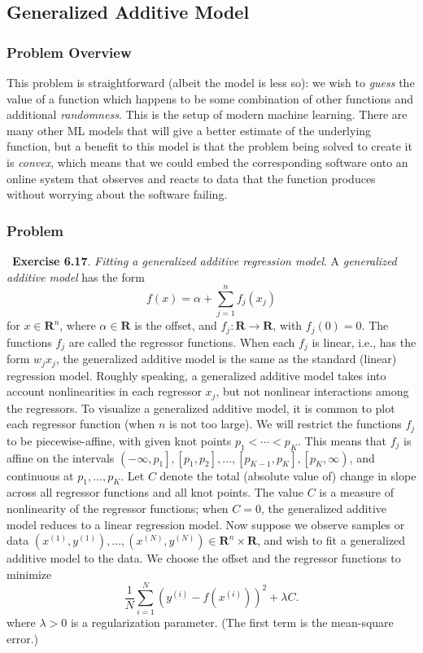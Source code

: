 \documentclass[12pt,reqno]{article}
\theoremstyle{definition}
\numberwithin{equation}{section}
\begin{document}
\newpage
\subsection{Generalized Additive Model}

\subsubsection*{Problem Overview}
This problem is straightforward (albeit the model is less so): we wish to \textit{guess} the value
of a function which happens to be some combination of other functions and additional \textit{randomness}.
This is the setup of modern machine learning. There are many other ML models that will
give a better estimate of the underlying function, but a benefit to this model is that
the problem being solved to create it is \textit{convex}, which means that we could embed the corresponding software
onto an online system that observes and reacts to data that the function produces without worrying about
the software failing. 

\subsubsection*{Problem}
~\cite{EE364a-extra}\textbf{Exercise 6.17}. \textit{Fitting a generalized additive regression model}.
A \textit{generalized additive model} has the form
\[
f(x)=\alpha+\sum_{j=1}^n f_j\left(x_j\right)
\]
for $x \in \mathbf{R}^n$, where $\alpha \in \mathbf{R}$ is the offset, and $f_j: \mathbf{R} \rightarrow \mathbf{R}$, with $f_j(0)=0$.
The functions $f_j$ are called the regressor functions. When each $f_j$ is linear, i.e., has the form $w_j x_j$,
the generalized additive model is the same as the standard (linear) regression model.
Roughly speaking, a generalized additive model takes into account nonlinearities in each regressor $x_j$, but not nonlinear interactions among the regressors.
To visualize a generalized additive model, it is common to plot each regressor function (when $n$ is not too large).
We will restrict the functions $f_j$ to be piecewise-affine, with given knot points $p_1<\cdots<p_K$. This means that $f_j$ is affine on the intervals
$\left(-\infty, p_1\right],\left[p_1, p_2\right], \ldots,\left[p_{K-1}, p_K\right],\left[p_K, \infty\right)$, and continuous at $p_1, \ldots, p_K$.
Let $C$ denote the total (absolute value of) change in slope across all regressor functions and all knot points.
The value $C$ is a measure of nonlinearity of the regressor functions; when $C=0$, the generalized additive model reduces to a linear regression model.
Now suppose we observe samples or data $\left(x^{(1)}, y^{(1)}\right), \ldots,\left(x^{(N)}, y^{(N)}\right) \in \mathbf{R}^n \times \mathbf{R}$,
and wish to fit a generalized additive model to the data. We choose the offset and the regressor functions to minimize
\[
\frac{1}{N} \sum_{i=1}^N\left(y^{(i)}-f(x^{(i)})\right)^2+\lambda C.
\]
where $\lambda>0$ is a regularization parameter. (The first term is the mean-square error.)
\end{document}

